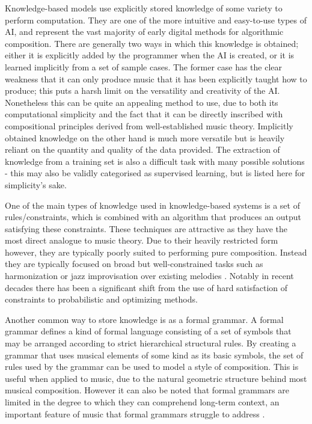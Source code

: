 \documentclass[ author={Stephen Livermore-Tozer},
				supervisor={Dr. Peter Flach},
				degree={MEng},
				title={Performing Algorithmic Co-composition Using Machine Learning},
				subtitle={},
				type={research},
				year={2016} ]{dissertation}
\begin{document}
	Knowledge-based models use explicitly stored knowledge of some variety to perform computation. They are one of the more intuitive and easy-to-use types of AI, and represent the vast majority of early digital methods for algorithmic composition. There are generally two ways in which this knowledge is obtained; either it is explicitly added by the programmer when the AI is created, or it is learned implicitly from a set of sample cases. The former case has the clear weakness that it can only produce music that it has been explicitly taught how to produce; this puts a harsh limit on the versatility and creativity of the AI. Nonetheless this can be quite an appealing method to use, due to both its computational simplicity and the fact that it can be directly inscribed with compositional principles derived from well-established music theory. Implicitly obtained knowledge on the other hand is much more versatile but is heavily reliant on the quantity and quality of the data provided. The extraction of knowledge from a training set is also a difficult task with many possible solutions - this may also be validly categorised as supervised learning, but is listed here for simplicity's sake. 
	
	One of the main types of knowledge used in knowledge-based systems is a set of rules/constraints, which is combined with an algorithm that produces an output satisfying these constraints. These techniques are attractive as they have the most direct analogue to music theory. Due to their heavily restricted form however, they are typically poorly suited to performing pure composition. Instead they are typically focused on broad but well-constrained tasks such as harmonization \cite{thomas1985vivace} or jazz improvisation over existing melodies \cite{horowitz1995representing}. Notably in recent decades there has been a significant shift from the use of hard satisfaction of constraints to probabilistic and optimizing methods.
	
	Another common way to store knowledge is as a formal grammar. A formal grammar defines a kind of formal language consisting of a set of symbols that may be arranged according to strict hierarchical structural rules. By creating a grammar that uses musical elements of some kind as its basic symbols, the set of rules used by the grammar can be used to model a style of composition. This is useful when applied to music, due to the natural geometric structure behind most musical composition. However it can also be noted that formal grammars are limited in the degree to which they can comprehend long-term context, an important feature of music that formal grammars struggle to address \cite{moorer1972music}.	 
	
\end{document}
